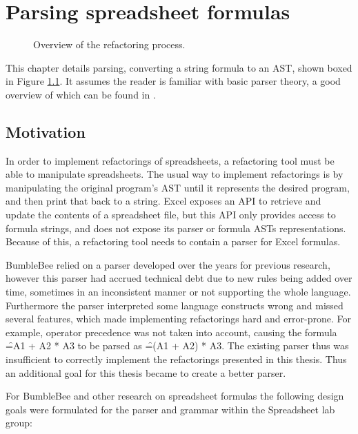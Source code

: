 
\chapter{Parsing spreadsheet formulas}
\label{chapter:parsing}

\noindent
\begin{figure}[h]
\centerfloat

\caption{Overview of the refactoring process.}
\label{fig:chapterparsingintrofigure}
\end{figure}


\noindent
This chapter details parsing, converting a string formula to an AST, shown boxed in Figure \ref{fig:chapterparsingintrofigure}.
It assumes the reader is familiar with basic parser theory, a good overview of which can be found in \cite{dragonbook}.

\section{Motivation}
\label{sec:motivation}

In order to implement refactorings of spreadsheets, a refactoring tool must be able to manipulate spreadsheets.
The usual way to implement refactorings is by manipulating the original program's AST until it represents the desired program, and then print that back to a string.
Excel exposes an API to retrieve and update the contents of a spreadsheet file, but this API only provides access to formula strings, and does not expose its parser or formula ASTs representations.
Because of this, a refactoring tool needs to contain a parser for Excel formulas.

BumbleBee relied on a parser developed over the years for previous research, however this parser had accrued technical debt due to new rules being added over time, sometimes in an inconsistent manner or not supporting the whole language.
Furthermore the parser interpreted some language constructs wrong and missed several features, which made implementing refactorings hard and error-prone.
For example, operator precedence was not taken into account, causing the formula \f{=A1 + A2 * A3} to be parsed as \f{=(A1 + A2) * A3}.
The existing parser thus was insufficient to correctly implement the refactorings presented in this thesis.
Thus an additional goal for this thesis became to create a better parser.

For BumbleBee and other research on spreadsheet formulas the following design goals were formulated for the parser and grammar within the Spreadsheet lab group:

